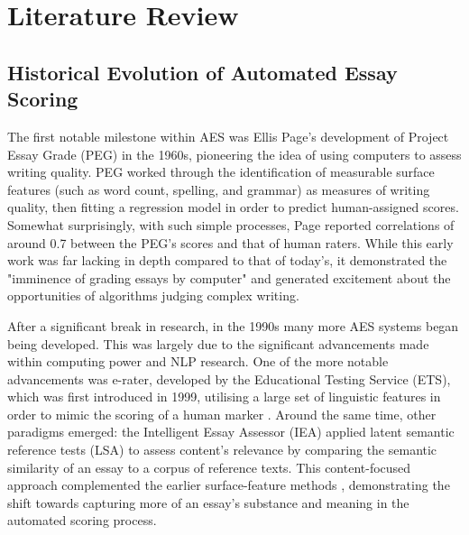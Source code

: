 \documentclass[12pt,a4paper]{report}
\begin{document}
\chapter{Literature Review}
\section{Historical Evolution of Automated Essay Scoring}
The first notable milestone within AES was Ellis Page’s development of Project Essay Grade (PEG) in the 1960s, pioneering the idea of using computers to assess writing quality. PEG worked through the identification of measurable surface features (such as word count, spelling, and grammar) as measures of writing quality, then fitting a regression model in order to predict human-assigned scores. Somewhat surprisingly, with such simple processes, Page reported correlations of around 0.7 between the PEG's scores and that of human raters. While this early work was far lacking in depth compared to that of today’s, it demonstrated the "imminence of grading essays by computer" \citep{page1966imminence} and generated excitement about the opportunities of algorithms judging complex writing.

After a significant break in research, in the 1990s many more AES systems began being developed. This was largely due to the significant advancements made within computing power and NLP research. One of the more notable advancements was e-rater, developed by the Educational Testing Service (ETS), which was first introduced in 1999, utilising a large set of linguistic features in order to mimic the scoring of a human marker \citep{e-rater2006}. Around the same time, other paradigms emerged: the Intelligent Essay Assessor (IEA) applied latent semantic reference tests (LSA) to assess content's relevance by comparing the semantic similarity of an essay to a corpus of reference texts. This content-focused approach complemented the earlier surface-feature methods \citep{landauer2003iea}, demonstrating the shift towards capturing more of an essay's substance and meaning in the automated scoring process.
\end{document}
